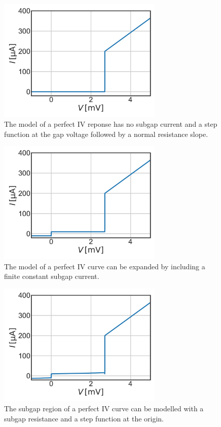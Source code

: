 \documentclass[]{article}
\begin{document}
\begin{figure}
	\centering
	\includegraphics[width=0.7\textwidth]{./../IV_Curve_Simulations_Unit_Test/2020_01_06//Perfect.pdf}
	\caption{The model of a perfect IV reponse has no subgap current and a step function at the gap voltage followed by a normal resistance slope.}
	\label{fig:Perfect}
\end{figure}
\begin{figure}
	\centering
	\includegraphics[width=0.7\textwidth]{./../IV_Curve_Simulations_Unit_Test/2020_01_06//SubgapLeakageOffset.pdf}
	\caption{The model of a perfect IV curve can be expanded by including a finite constant subgap current.}
	\label{fig:SubgapLeakageOffset}
\end{figure}
\begin{figure}
\centering
\includegraphics[width=0.7\textwidth]{./../IV_Curve_Simulations_Unit_Test/2020_01_06//SubgapLeakage_SubgapLeakageOffset.pdf}
\caption{The subgap region of a perfect IV curve can be modelled with a subgap resistance and a step function at the origin.}
\label{fig:SubgapLeakage_SubgapLeakageOffset}
\end{figure}
\end{document}

